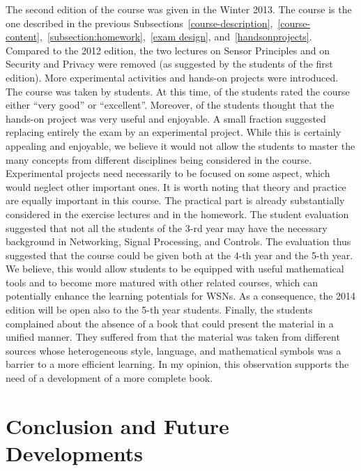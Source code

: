 \documentclass[onecolumn,12pt,draftclsnofoot,a4paper,peerreview]{IEEEtran}
\begin{document}
The second edition of the course was given in the Winter 2013. The course is the one described in the previous Subsections~\ref{course-description},~\ref{course-content},~\ref{subsection:homework},~\ref{exam design}, and~\ref{handsonprojects}. Compared to the 2012 edition, the two lectures on Sensor Principles and on Security and Privacy were removed (as suggested by the students of the first edition). More experimental activities and hands-on projects were introduced. The course was taken by  students. At this time,  of the students rated the course either ``very good'' or ``excellent''. Moreover,   of the students thought that the hands-on project was very useful and enjoyable. A small fraction suggested replacing entirely the exam by an experimental project. While this is certainly appealing and enjoyable, we believe it would not allow the students to master the many concepts from different disciplines being considered in the course. Experimental projects need necessarily to be focused on some aspect, which would neglect other important ones. It is worth noting that theory and practice are equally important in this course. The practical part is already substantially considered in the exercise lectures and in the homework. The student evaluation suggested that not all the students of the 3-rd year may have the necessary background in Networking, Signal Processing, and Controls. The evaluation thus suggested that the course could be given both at the 4-th year and the 5-th year. We believe, this would allow students  to be equipped with useful mathematical tools and to become more matured with other related courses, which can potentially enhance the learning potentials for WSNs. As a consequence, the 2014 edition will be open also to the 5-th year students. Finally, the students complained about the absence of a book that could present the material in a unified manner. They suffered from that the material was taken from different sources whose heterogeneous style, language, and mathematical symbols was a barrier to a more efficient learning. In my opinion, this observation supports the need of a development of a more complete book. 

\section{Conclusion and Future Developments} \label{conclusions}
\end{document}
